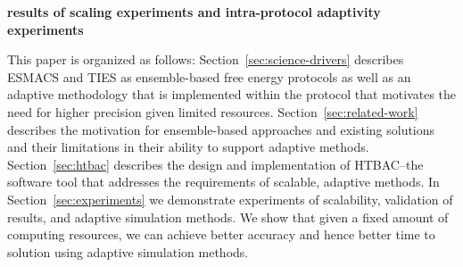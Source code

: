 \textbf{results of scaling experiments and intra-protocol adaptivity experiments}

This paper is organized as follows: 
Section~\ref{sec:science-drivers} describes ESMACS and TIES as ensemble-based 
free energy protocols as well as an adaptive methodology that is implemented 
within the protocol that motivates the need for higher precision given limited 
resources. 
Section~\ref{sec:related-work} describes the motivation for ensemble-based 
approaches and existing solutions and their limitations in their ability to 
support adaptive methods.  
Section~\ref{sec:htbac} describes the design and implementation of 
HTBAC--the software tool that addresses the requirements of scalable, 
adaptive methods. 
In Section~\ref{sec:experiments} we demonstrate experiments of scalability, 
validation of results, and adaptive simulation methods. We show that given a 
fixed amount of computing resources, we can achieve better accuracy and hence 
better time to solution using adaptive simulation methods. 





